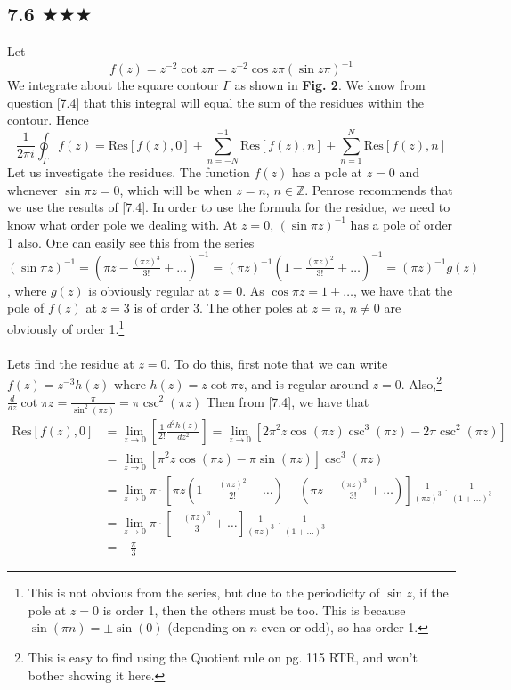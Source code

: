 \subsection{7.6 $\bigstar\bigstar \bigstar$}
Let $$f(z)=z^{-2}\cot z\pi=z^{-2}\cos z\pi(\sin z\pi)^{-1}$$
We integrate about the square contour $\Gamma$ as shown in \textbf{Fig. 2}. We know from question [7.4] that this integral will equal the sum of the residues within the contour. Hence
\begin{equation}\label{totalint}
\frac{1}{2\pi i}\oint_\Gamma f(z)=\text{Res}[f(z),0]+\sum^{-1}_{n=-N}\text{Res}[f(z),n]+\sum^{N}_{n=1}\text{Res}[f(z),n]\end{equation}
Let us investigate the residues. The function $f(z)$ has a pole at $z=0$ and whenever $\sin \pi z=0$, which will be when $z=n$, $n\in \mathbb{Z}$. Penrose recommends that we use the results of [7.4]. In order to use the formula for the residue, we need to know what order pole we dealing with. At $z=0$, $(\sin \pi z)^{-1}$ has a pole of order 1 also. One can easily see this from the series $(\sin \pi z)^{-1}=(\pi z-\frac{(\pi z)^3}{3!}+\ldots)^{-1}=(\pi z)^{-1}(1-\frac{(\pi z)^2}{3!}+\ldots)^{-1}=(\pi z)^{-1} g(z)$, where $g(z)$ is obviously regular at $z=0$. As $\cos \pi z= 1+\ldots$, we have that the pole of $f(z)$ at $z=3$ is of order 3. The other poles at $z=n$, $n\neq 0$ are obviously of order 1.\footnote{This is not obvious from the series, but due to the periodicity of $\sin z$, if the pole at $z=0$ is order 1, then the others must be too. This is because $\sin(\pi n)=\pm \sin(0)$ (depending on $n$ even or odd), so has order 1.}\\ \\
Lets find the residue at $z=0$. To do this, first note that we can write $f(z)=z^{-3}h(z)$ where $h(z)=z\cot \pi z$, and is regular around $z=0$. Also,\footnote{This is easy to find using the Quotient rule on pg. 115 RTR, and won't bother showing it here.}
$\frac{d }{d z}\cot \pi z=\frac{\pi}{\sin^2(\pi z)}=\pi \csc^2(\pi z)$
Then from [7.4], we have that 
\begin{align*}
\text{Res}[f(z),0]&=\lim_{z\to 0}\left[\frac{1}{2!}\frac{d^2 h(z)}{d z^2}\right]=\lim_{z\to 0}\left[2\pi^2 z \cos(\pi z) \csc^3(\pi z)-2\pi\csc^2(\pi z)\right]\\
&=\lim_{z\to 0}\left[  \pi^2 z \cos(\pi z) -\pi\sin(\pi z)            \right]\csc^3(\pi z)\\
&=\lim_{z\to 0}\pi\cdot\left[ \pi z(1-\frac{(\pi z)^2}{2!}+\ldots)-(\pi z -\frac{(\pi z)^3}{3!}+\ldots)\right]\frac{1}{(\pi z)^3}\cdot \frac{1}{(1+\ldots)^{3}}\\
&=\lim_{z\to 0}\pi\cdot\left[-\frac{(\pi z)^3}{3}+\ldots\right]\frac{1}{(\pi z)^3}\cdot \frac{1}{(1+\ldots)^{3}}\\
&=-\frac{\pi}{3}
\end{align*}
